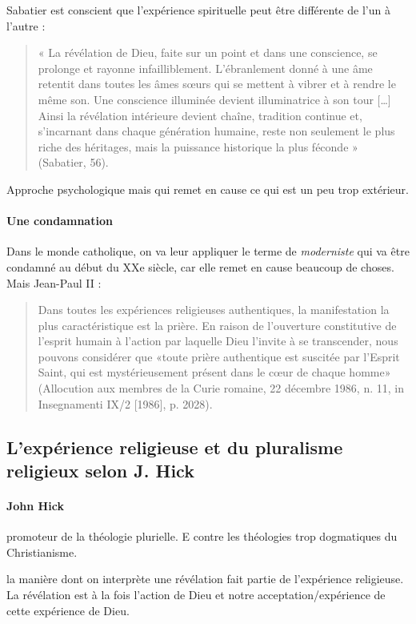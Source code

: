 Sabatier est conscient que l'expérience spirituelle peut être différente de l'un à l'autre : 
\begin{quote}
    « La révélation de Dieu, faite sur un point et dans une conscience, se prolonge et rayonne infailliblement. L’ébranlement donné à une âme retentit dans toutes les âmes sœurs qui se mettent à vibrer et à rendre le même son. Une conscience illuminée devient illuminatrice à son tour […] Ainsi la révélation intérieure devient chaîne, tradition continue et, s’incarnant dans chaque génération humaine, reste non seulement le plus riche des héritages, mais la puissance historique la plus féconde » (Sabatier, 56). 
\end{quote}

Approche psychologique mais qui remet en cause ce qui est un peu trop extérieur.
\paragraph{Une condamnation}
Dans le monde catholique, on va leur appliquer le terme de \textit{moderniste} qui va être condamné au début du XXe siècle, car elle remet en cause beaucoup de choses.
Mais Jean-Paul II  : 
\begin{quote}
Dans toutes les expériences religieuses authentiques, la manifestation la plus caractéristique est la prière. En raison de l'ouverture constitutive de l'esprit humain à l'action par laquelle Dieu l'invite à se transcender, nous pouvons considérer que «toute prière authentique est suscitée par l'Esprit Saint, qui est mystérieusement présent dans le cœur de chaque homme» (Allocution aux membres de la Curie romaine, 22 décembre 1986, n. 11, in Insegnamenti IX/2 [1986], p. 2028).
   
\end{quote}

\subsection{L’expérience religieuse et du pluralisme religieux selon J. Hick}


\paragraph{John Hick} promoteur de la théologie plurielle. E  contre les théologies trop dogmatiques du Christianisme.


la manière dont on interprète une révélation fait partie de l'expérience religieuse. La révélation est à la fois l'action de Dieu et notre acceptation/expérience de cette expérience de Dieu.





